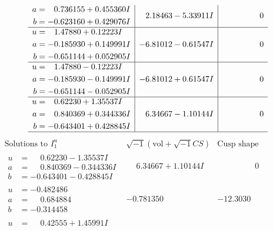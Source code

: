 \documentclass[1p]{elsarticle_modified}
\theoremstyle{definition}
\newcommand{\I}{\sqrt{-1}}
\begin{document}
$$\begin{array}{c|c|c}
\begin{aligned}
a &= \phantom{-}0.736155 + 0.455360 I \\
b &= -0.623160 + 0.429076 I\end{aligned}
 & \phantom{-}2.18463 - 5.33911 I & \phantom{-0.000000 } 0 \\ \hline\begin{aligned}
u &= \phantom{-}1.47880 + 0.12223 I \\
a &= -0.185930 + 0.149991 I \\
b &= -0.651144 + 0.052905 I\end{aligned}
 & -6.81012 - 0.61547 I & \phantom{-0.000000 } 0 \\ \hline\begin{aligned}
u &= \phantom{-}1.47880 - 0.12223 I \\
a &= -0.185930 - 0.149991 I \\
b &= -0.651144 - 0.052905 I\end{aligned}
 & -6.81012 + 0.61547 I & \phantom{-0.000000 } 0 \\ \hline\begin{aligned}
u &= \phantom{-}0.62230 + 1.35537 I \\
a &= \phantom{-}0.840369 + 0.344336 I \\
b &= -0.643401 + 0.428845 I\end{aligned}
 & \phantom{-}6.34667 - 1.10144 I & \phantom{-0.000000 } 0\\
 \hline 
 \end{array}$$\newpage$$\begin{array}{c|c|c}  
\text{Solutions to }I^u_{1}& \I (\text{vol} + \sqrt{-1}CS) & \text{Cusp shape}\\
 \hline 
\begin{aligned}
u &= \phantom{-}0.62230 - 1.35537 I \\
a &= \phantom{-}0.840369 - 0.344336 I \\
b &= -0.643401 - 0.428845 I\end{aligned}
 & \phantom{-}6.34667 + 1.10144 I & \phantom{-0.000000 } 0 \\ \hline\begin{aligned}
u &= -0.482486\phantom{ +0.000000I} \\
a &= \phantom{-}0.684884\phantom{ +0.000000I} \\
b &= -0.314458\phantom{ +0.000000I}\end{aligned}
 & -0.781350\phantom{ +0.000000I} & -12.3030\phantom{ +0.000000I} \\ \hline\begin{aligned}
u &= \phantom{-}0.42555 + 1.45991 I \\

\end{aligned}
\end{array}$$
\end{document}
